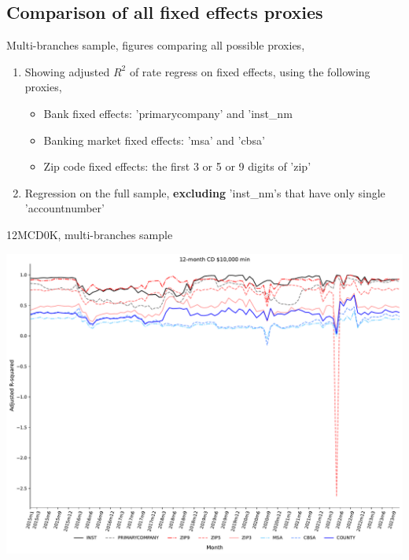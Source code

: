 \documentclass{beamer}
\begin{document}
\subsection{Comparison of all fixed effects proxies}

\begin{frame}
    \vfill
    \centering
    {Multi-branches sample, figures comparing all possible proxies,}
    \begin{enumerate}
        \item Showing adjusted $R^2$ of rate regress on fixed effects, using the following proxies, 
        \begin{itemize}
            \item Bank fixed effects: 'primarycompany' and 'inst\_nm
            \item Banking market fixed effects: 'msa' and 'cbsa'
            \item Zip code fixed effects: the first 3 or 5 or 9 digits of 'zip'
        \end{itemize}    
        \item Regression on the full sample, {\textbf{excluding}} 'inst\_nm's that have only single 'accountnumber'
    \end{enumerate}
    \vfill
\end{frame}


\begin{frame}{12MCD0K, multi-branches sample}
\begin{center}
\includegraphics[width=1\textwidth]{figure/multi_branch_sample_932466/all_fixed_effects/12MCD10K_adjusted_R2_all_fixed_effects.pdf} 
\end{center}
\end{frame}
\end{document}
